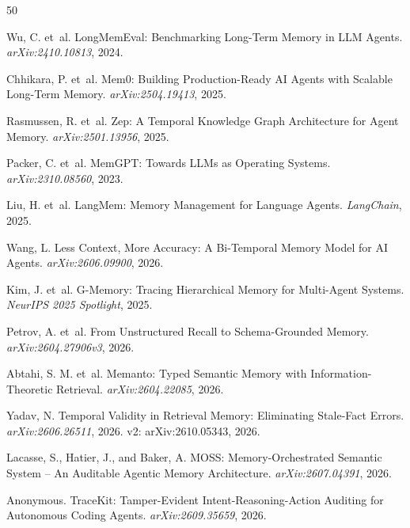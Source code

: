 \documentclass{article}
\begin{document}
\begin{thebibliography}{50}

Wu, C. et~al.
\newblock LongMemEval: Benchmarking Long-Term Memory in LLM Agents.
\newblock \emph{arXiv:2410.10813}, 2024.

Chhikara, P. et~al.
\newblock Mem0: Building Production-Ready AI Agents with Scalable Long-Term Memory.
\newblock \emph{arXiv:2504.19413}, 2025.

Rasmussen, R. et~al.
\newblock Zep: A Temporal Knowledge Graph Architecture for Agent Memory.
\newblock \emph{arXiv:2501.13956}, 2025.

Packer, C. et~al.
\newblock MemGPT: Towards LLMs as Operating Systems.
\newblock \emph{arXiv:2310.08560}, 2023.

Liu, H. et~al.
\newblock LangMem: Memory Management for Language Agents.
\newblock \emph{LangChain}, 2025.

Wang, L.
\newblock Less Context, More Accuracy: A Bi-Temporal Memory Model for AI Agents.
\newblock \emph{arXiv:2606.09900}, 2026.

Kim, J. et~al.
\newblock G-Memory: Tracing Hierarchical Memory for Multi-Agent Systems.
\newblock \emph{NeurIPS 2025 Spotlight}, 2025.

Petrov, A. et~al.
\newblock From Unstructured Recall to Schema-Grounded Memory.
\newblock \emph{arXiv:2604.27906v3}, 2026.

Abtahi, S. M. et~al.
\newblock Memanto: Typed Semantic Memory with Information-Theoretic Retrieval.
\newblock \emph{arXiv:2604.22085}, 2026.

Yadav, N.
\newblock Temporal Validity in Retrieval Memory: Eliminating Stale-Fact Errors.
\newblock \emph{arXiv:2606.26511}, 2026. v2: arXiv:2610.05343, 2026.

Lacasse, S., Hatier, J., and Baker, A.
\newblock MOSS: Memory-Orchestrated Semantic System -- An Auditable Agentic Memory Architecture.
\newblock \emph{arXiv:2607.04391}, 2026.

Anonymous.
\newblock TraceKit: Tamper-Evident Intent-Reasoning-Action Auditing for Autonomous Coding Agents.
\newblock \emph{arXiv:2609.35659}, 2026.


\end{thebibliography}
\end{document}

